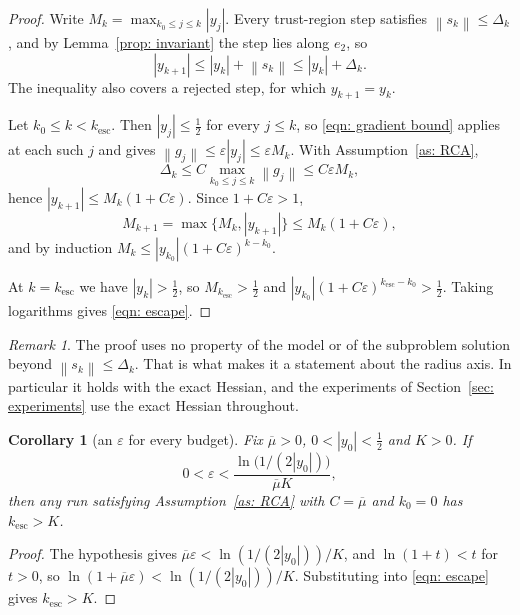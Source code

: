 \documentclass[11pt,a4paper]{article}
\providecommand{\abs}[1]{\left \vert #1 \right \vert}
\providecommand{\norm}[1]{\left \lVert #1 \right \rVert}
\newtheorem{corollary}[proposition]{Corollary}
\theoremstyle{definition}
\theoremstyle{remark}
\newtheorem{remark}{Remark}
\begin{document}
\begin{proof}
  Write $M_k = \max_{k_0 \leq j \leq k}\abs{y_j}$. Every trust-region step
  satisfies $\norm{s_k} \leq \Delta_k$, and by Lemma~\ref{prop: invariant} the
  step lies along $e_2$, so
  \[
    \abs{y_{k+1}} \leq \abs{y_k} + \norm{s_k} \leq \abs{y_k} + \Delta_k .
  \]
  The inequality also covers a rejected step, for which $y_{k+1} = y_k$.

  Let $k_0 \leq k < k_{\mathrm{esc}}$. Then $\abs{y_j} \leq \tfrac12$ for every
  $j \leq k$, so \eqref{eqn: gradient bound} applies at each such $j$ and gives
  $\norm{g_j} \leq \varepsilon\abs{y_j} \leq \varepsilon M_k$. With
  Assumption~\ref{as: RCA},
  \[
    \Delta_k \leq C \max_{k_0 \leq j \leq k}\norm{g_j} \leq C\varepsilon M_k ,
  \]
  hence $\abs{y_{k+1}} \leq M_k(1 + C\varepsilon)$. Since $1 + C\varepsilon > 1$,
  \[
    M_{k+1} = \max\{M_k, \abs{y_{k+1}}\} \leq M_k(1 + C\varepsilon) ,
  \]
  and by induction $M_k \leq \abs{y_{k_0}}(1+C\varepsilon)^{k-k_0}$.

  At $k = k_{\mathrm{esc}}$ we have $\abs{y_{k}} > \tfrac12$, so
  $M_{k_{\mathrm{esc}}} > \tfrac12$ and
  $\abs{y_{k_0}}(1+C\varepsilon)^{k_{\mathrm{esc}}-k_0} > \tfrac12$. Taking
  logarithms gives \eqref{eqn: escape}.
\end{proof}

\begin{remark}
  The proof uses no property of the model or of the subproblem solution beyond
  $\norm{s_k} \leq \Delta_k$. That is what makes it a statement about the radius
  axis. In particular it holds with the exact Hessian, and the experiments of
  Section~\ref{sec: experiments} use the exact Hessian throughout.
\end{remark}

\begin{corollary}[an $\varepsilon$ for every budget]\label{prop: budget}
  Fix $\overline{\mu} > 0$, $0 < \abs{y_0} < \tfrac12$ and $K > 0$. If
  \[
    0 < \varepsilon < \frac{\ln\bigl(1/(2\abs{y_0})\bigr)}{\overline{\mu}K} ,
  \]
  then any run satisfying Assumption~\ref{as: RCA} with $C = \overline{\mu}$ and
  $k_0 = 0$ has $k_{\mathrm{esc}} > K$.
\end{corollary}

\begin{proof}
  The hypothesis gives
  $\overline{\mu}\varepsilon < \ln(1/(2\abs{y_0}))/K$, and $\ln(1+t) < t$ for
  $t > 0$, so $\ln(1+\overline{\mu}\varepsilon) < \ln(1/(2\abs{y_0}))/K$.
  Substituting into \eqref{eqn: escape} gives $k_{\mathrm{esc}} > K$.
\end{proof}
\end{document}
